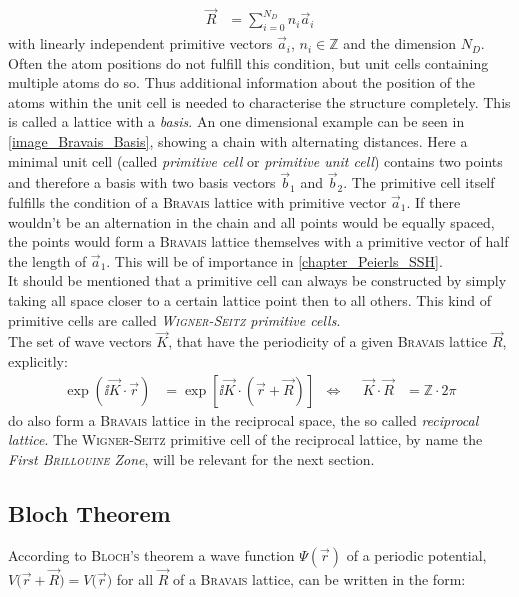 \begin{align}
	\vec{R} &= \sum_{i = 0}^{N_D} n_i \vec{a}_i
\end{align}
with linearly independent primitive vectors $\vec{a}_i$, $n_i \in \mathbb{Z}$ and the dimension $N_D$.\\ Often the atom positions do not fulfill this condition, but unit cells containing multiple atoms do so. Thus additional information about the position of the atoms within the unit cell is needed to characterise the structure completely. This is called a lattice with a \emph{basis}. An one dimensional example can be seen in \cref{image_Bravais_Basis}, showing a chain with alternating distances. Here a minimal unit cell (called \emph{primitive cell} or \emph{primitive unit cell}) contains two points and therefore a basis with two basis vectors $\vec{b}_1$ and $\vec{b}_2$. The primitive cell itself fulfills the condition of a \textsc{Bravais} lattice with primitive vector $\vec{a}_1$. If there wouldn't be an alternation in the chain and all points would be equally spaced, the points would form a \textsc{Bravais} lattice themselves with a primitive vector of half the length of $\vec{a}_1$. This will be of importance in \cref{chapter_Peierls_SSH}.\\
It should be mentioned that a primitive cell can always be constructed by simply taking all space closer to a certain lattice point then to all others. This kind of primitive cells are called \emph{\textsc{Wigner-Seitz} primitive cells}.\\
The set of wave vectors $\vec{K}$, that have the periodicity of a given \textsc{Bravais} lattice $\vec{R}$, explicitly:
\begin{align}
\exp\left(\ii\vec{K}\cdot\vec{r}\right) &= \exp\left[\ii\vec{K}\cdot\left(\vec{r} + \vec{R}\right)\right] &\Leftrightarrow& &\vec{K}\cdot\vec{R} &= \mathbb{Z}\cdot 2\pi	
\end{align}
do also form a \textsc{Bravais} lattice in the reciprocal space, the so called \emph{reciprocal lattice}. The \textsc{Wigner-Seitz} primitive cell of the reciprocal lattice, by name the \emph{First \textsc{Brillouine} Zone}, will be relevant for the next section.

\subsection{Bloch Theorem}
\label{section_bloch}
According to \textsc{Bloch's} theorem a wave function $\Psi(\vec{r})$ of a periodic potential, $V\big(\vec{r} + \vec{R}\big)= V\big(\vec{r}\big)$ for all $\vec{R}$ of a \textsc{Bravais} lattice, can be written in the form:


